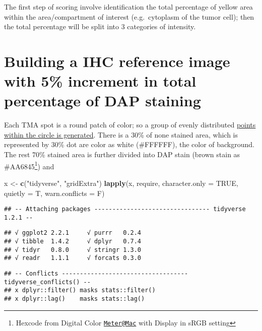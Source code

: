 \documentclass[]{article}
\newenvironment{Shaded}{\begin{snugshade}}{\end{snugshade}}
\newcommand{\DataTypeTok}[1]{\textcolor[rgb]{0.13,0.29,0.53}{#1}}
\newcommand{\KeywordTok}[1]{\textcolor[rgb]{0.13,0.29,0.53}{\textbf{#1}}}
\newcommand{\NormalTok}[1]{#1}
\newcommand{\OtherTok}[1]{\textcolor[rgb]{0.56,0.35,0.01}{#1}}
\newcommand{\StringTok}[1]{\textcolor[rgb]{0.31,0.60,0.02}{#1}}
\let\rmarkdownfootnote\footnote%
\def\footnote{\protect\rmarkdownfootnote}
\begin{document}
The first step of scoring involve identification the total percentage of
yellow area within the area/compartment of interest (e.g.~cytoplasm of
the tumor cell); then the total percentage will be split into 3
categories of intensity.

\hypertarget{building-a-ihc-reference-image-with-5-increment-in-total-percentage-of-dap-staining}{%
\section{Building a IHC reference image with 5\% increment in total
percentage of DAP
staining}\label{building-a-ihc-reference-image-with-5-increment-in-total-percentage-of-dap-staining}}

Each TMA spot is a round patch of color; so a group of evenly
distributed
\href{https://stackoverflow.com/questions/5837572/generate-a-random-point-within-a-circle-uniformly/5838055\#5838055}{points
within the circle is generated}. There is a 30\% of none stained area,
which is represented by 30\% dot are color as white (\#FFFFFF), the
color of background. The rest 70\% stained area is further divided into
DAP stain (brown stain as \#AA6845\footnote{Hexcode from Digital Color
  \href{mailto:Meter@Mac}{\nolinkurl{Meter@Mac}} with Display in sRGB
  setting}) and

\begin{Shaded}
\begin{Highlighting}[]
\NormalTok{x <-}\StringTok{ }\KeywordTok{c}\NormalTok{(}\StringTok{"tidyverse"}\NormalTok{, }\StringTok{"gridExtra"}\NormalTok{)}
\KeywordTok{lapply}\NormalTok{(x, require, }\DataTypeTok{character.only =} \OtherTok{TRUE}\NormalTok{, }\DataTypeTok{quietly =}\NormalTok{ T,  }\DataTypeTok{warn.conflicts =}\NormalTok{ F)}
\end{Highlighting}
\end{Shaded}

\begin{verbatim}
## -- Attaching packages -------------------------------- tidyverse 1.2.1 --
\end{verbatim}

\begin{verbatim}
## √ ggplot2 2.2.1     √ purrr   0.2.4
## √ tibble  1.4.2     √ dplyr   0.7.4
## √ tidyr   0.8.0     √ stringr 1.3.0
## √ readr   1.1.1     √ forcats 0.3.0
\end{verbatim}

\begin{verbatim}
## -- Conflicts ----------------------------------- tidyverse_conflicts() --
## x dplyr::filter() masks stats::filter()
## x dplyr::lag()    masks stats::lag()
\end{verbatim}
\end{document}
